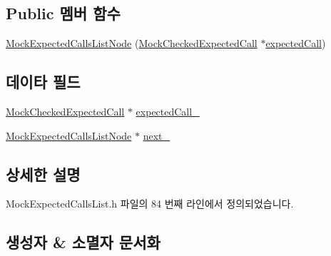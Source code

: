 \subsection*{Public 멤버 함수}
\begin{DoxyCompactItemize}
\item 
\hyperlink{class_mock_expected_calls_list_1_1_mock_expected_calls_list_node_a8cbc5653514423c765670d751f8ea99c}{Mock\+Expected\+Calls\+List\+Node} (\hyperlink{class_mock_checked_expected_call}{Mock\+Checked\+Expected\+Call} $\ast$\hyperlink{_mock_support__c_8cpp_a4640ae963cf020e35f7ebd1481685c8b}{expected\+Call})
\end{DoxyCompactItemize}
\subsection*{데이타 필드}
\begin{DoxyCompactItemize}
\item 
\hyperlink{class_mock_checked_expected_call}{Mock\+Checked\+Expected\+Call} $\ast$ \hyperlink{class_mock_expected_calls_list_1_1_mock_expected_calls_list_node_a840e02d52408beb09a8225d63a115d98}{expected\+Call\+\_\+}
\item 
\hyperlink{class_mock_expected_calls_list_1_1_mock_expected_calls_list_node}{Mock\+Expected\+Calls\+List\+Node} $\ast$ \hyperlink{class_mock_expected_calls_list_1_1_mock_expected_calls_list_node_aaae452a372ae14c06a6d5d252df73725}{next\+\_\+}
\end{DoxyCompactItemize}


\subsection{상세한 설명}


Mock\+Expected\+Calls\+List.\+h 파일의 84 번째 라인에서 정의되었습니다.



\subsection{생성자 \& 소멸자 문서화}
